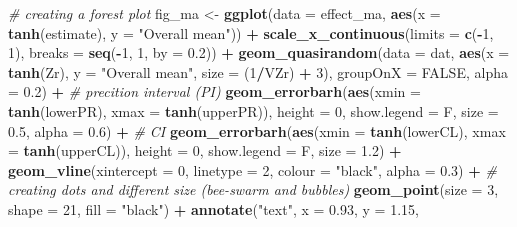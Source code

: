 \documentclass[
]{article}
\newenvironment{Shaded}{\begin{snugshade}}{\end{snugshade}}
\newcommand{\CommentTok}[1]{\textcolor[rgb]{0.56,0.35,0.01}{\textit{#1}}}
\newcommand{\DataTypeTok}[1]{\textcolor[rgb]{0.13,0.29,0.53}{#1}}
\newcommand{\DecValTok}[1]{\textcolor[rgb]{0.00,0.00,0.81}{#1}}
\newcommand{\FloatTok}[1]{\textcolor[rgb]{0.00,0.00,0.81}{#1}}
\newcommand{\KeywordTok}[1]{\textcolor[rgb]{0.13,0.29,0.53}{\textbf{#1}}}
\newcommand{\NormalTok}[1]{#1}
\newcommand{\OperatorTok}[1]{\textcolor[rgb]{0.81,0.36,0.00}{\textbf{#1}}}
\newcommand{\OtherTok}[1]{\textcolor[rgb]{0.56,0.35,0.01}{#1}}
\newcommand{\StringTok}[1]{\textcolor[rgb]{0.31,0.60,0.02}{#1}}
\begin{document}
\begin{Shaded}
\begin{Highlighting}[]
{\CommentTok{# creating a forest plot}
\NormalTok{fig_ma <-}\StringTok{ }\KeywordTok{ggplot}\NormalTok{(}\DataTypeTok{data =}\NormalTok{ effect_ma, }\KeywordTok{aes}\NormalTok{(}\DataTypeTok{x =} \KeywordTok{tanh}\NormalTok{(estimate), }\DataTypeTok{y =} \StringTok{"Overall mean"}\NormalTok{)) }\OperatorTok{+}\StringTok{ }
\StringTok{    }\KeywordTok{scale_x_continuous}\NormalTok{(}\DataTypeTok{limits =} \KeywordTok{c}\NormalTok{(}\OperatorTok{-}\DecValTok{1}\NormalTok{, }\DecValTok{1}\NormalTok{), }\DataTypeTok{breaks =} \KeywordTok{seq}\NormalTok{(}\OperatorTok{-}\DecValTok{1}\NormalTok{, }\DecValTok{1}\NormalTok{, }\DataTypeTok{by =} \FloatTok{0.2}\NormalTok{)) }\OperatorTok{+}\StringTok{ }\KeywordTok{geom_quasirandom}\NormalTok{(}\DataTypeTok{data =}\NormalTok{ dat, }
    \KeywordTok{aes}\NormalTok{(}\DataTypeTok{x =} \KeywordTok{tanh}\NormalTok{(Zr), }\DataTypeTok{y =} \StringTok{"Overall mean"}\NormalTok{, }\DataTypeTok{size =}\NormalTok{ (}\DecValTok{1}\OperatorTok{/}\NormalTok{VZr) }\OperatorTok{+}\StringTok{ }\DecValTok{3}\NormalTok{), }\DataTypeTok{groupOnX =} \OtherTok{FALSE}\NormalTok{, }
    \DataTypeTok{alpha =} \FloatTok{0.2}\NormalTok{) }\OperatorTok{+}\StringTok{ }\CommentTok{# precition interval (PI)}
\KeywordTok{geom_errorbarh}\NormalTok{(}\KeywordTok{aes}\NormalTok{(}\DataTypeTok{xmin =} \KeywordTok{tanh}\NormalTok{(lowerPR), }\DataTypeTok{xmax =} \KeywordTok{tanh}\NormalTok{(upperPR)), }\DataTypeTok{height =} \DecValTok{0}\NormalTok{, }\DataTypeTok{show.legend =}\NormalTok{ F, }
    \DataTypeTok{size =} \FloatTok{0.5}\NormalTok{, }\DataTypeTok{alpha =} \FloatTok{0.6}\NormalTok{) }\OperatorTok{+}\StringTok{ }\CommentTok{# CI}
\KeywordTok{geom_errorbarh}\NormalTok{(}\KeywordTok{aes}\NormalTok{(}\DataTypeTok{xmin =} \KeywordTok{tanh}\NormalTok{(lowerCL), }\DataTypeTok{xmax =} \KeywordTok{tanh}\NormalTok{(upperCL)), }\DataTypeTok{height =} \DecValTok{0}\NormalTok{, }\DataTypeTok{show.legend =}\NormalTok{ F, }
    \DataTypeTok{size =} \FloatTok{1.2}\NormalTok{) }\OperatorTok{+}\StringTok{ }
\KeywordTok{geom_vline}\NormalTok{(}\DataTypeTok{xintercept =} \DecValTok{0}\NormalTok{, }\DataTypeTok{linetype =} \DecValTok{2}\NormalTok{, }\DataTypeTok{colour =} \StringTok{"black"}\NormalTok{, }\DataTypeTok{alpha =} \FloatTok{0.3}\NormalTok{) }\OperatorTok{+}\StringTok{ }\CommentTok{# creating dots and different size (bee-swarm and bubbles)}
\KeywordTok{geom_point}\NormalTok{(}\DataTypeTok{size =} \DecValTok{3}\NormalTok{, }\DataTypeTok{shape =} \DecValTok{21}\NormalTok{, }\DataTypeTok{fill =} \StringTok{"black"}\NormalTok{) }\OperatorTok{+}\StringTok{ }\KeywordTok{annotate}\NormalTok{(}\StringTok{"text"}\NormalTok{, }\DataTypeTok{x =} \FloatTok{0.93}\NormalTok{, }\DataTypeTok{y =} \FloatTok{1.15}\NormalTok{, }
}
\end{Highlighting}
\end{Shaded}
\end{document}
